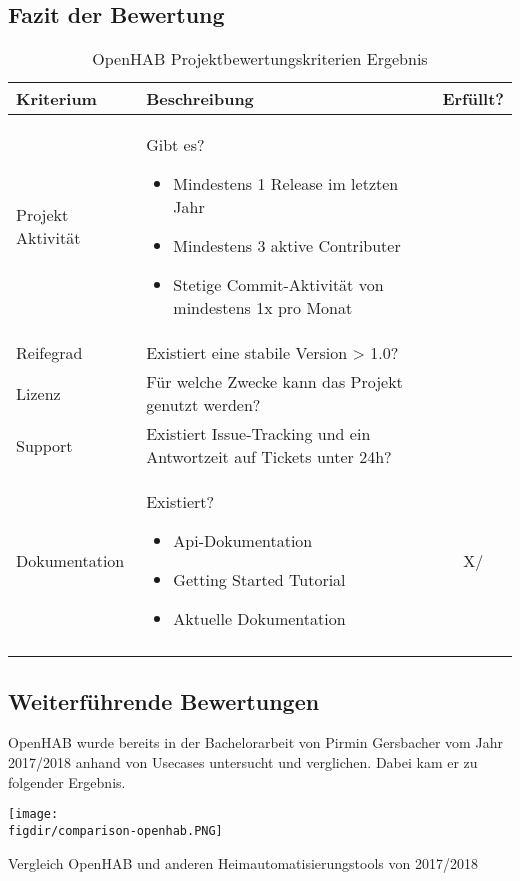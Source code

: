\subsection{Fazit der Bewertung}
\begin{longtable}{| p{3cm} | p{10cm}| c |}
	\hline
	\textbf{Kriterium} & \textbf{Beschreibung} & \textbf{Erfüllt?} \\
	\hline \hline
	\centering Projekt Aktivität & Gibt es?
	\begin{itemize}
		\item Mindestens 1 Release im letzten Jahr
		\item Mindestens 3 aktive Contributer
		\item Stetige Commit-Aktivität von mindestens 1x pro Monat
	\end{itemize} & \checkmark \\
	\hline
	\centering Reifegrad & Existiert eine stabile Version > 1.0? & \checkmark \\
	\hline
	\centering Lizenz & Für welche Zwecke kann das Projekt genutzt werden? & \checkmark \\
	\hline
	\centering Support & Existiert Issue-Tracking und ein Antwortzeit auf Tickets unter 24h? & \checkmark \\
	\hline
	\centering Dokumentation & Existiert?
	\begin{itemize}
		\item Api-Dokumentation
		\item Getting Started Tutorial
		\item Aktuelle Dokumentation
	\end{itemize} & X/\checkmark \\
	\hline
	\caption{OpenHAB Projektbewertungskriterien Ergebnis}
	\label{table:openhab-judgement-criteria-result}
\end{longtable}

\subsection{Weiterführende Bewertungen}
OpenHAB wurde bereits in der Bachelorarbeit von Pirmin Gersbacher vom Jahr 2017/2018 anhand von Usecases untersucht und verglichen. Dabei kam er zu folgender Ergebnis.

\begin{minipage}{\textwidth}
	\centering
	\captionsetup{type=figure}
	\texttt{[image: \\figdir/comparison-openhab.PNG]}
	\caption{Vergleich OpenHAB und anderen Heimautomatisierungstools von 2017/2018 \label{fig:comparison-openhab}}
\end{minipage}

